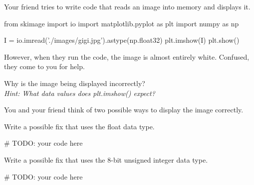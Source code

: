 \documentclass{csci1430}
\begin{document}
\pagebreak %

\begin{question}[points=5,drawbox=false] 
Your friend tries to write code that reads an image into memory and displays it.
\end{question}
    
\begin{python}
from skimage import io
import matplotlib.pyplot as plt
import numpy as np

I = io.imread('./images/gigi.jpg').astype(np.float32)
plt.imshow(I)
plt.show()
\end{python}
    
However, when they run the code, the image is almost entirely white. Confused, they come to you for help.

\begin{subquestion}[points=1]
Why is the image being displayed incorrectly?\\
\emph{Hint: What data values does plt.imshow() expect?}
\end{subquestion}

\begin{answer}[height=6]

\end{answer}

\begin{subquestion}[points=2,drawbox=false]
You and your friend think of two possible ways to display the image correctly.
\end{subquestion}

\begin{subsubquestion}[points=1]
Write a possible fix that uses the float data type.
\end{subsubquestion}

\begin{answer}[height=10]
\begin{python}
# TODO: your code here
\end{python}
\end{answer}


\pagebreak %

\begin{subsubquestion}[points=1]
Write a possible fix that uses the 8-bit unsigned integer data type.
\end{subsubquestion}

\begin{answer}[height=10]
\begin{python}
# TODO: your code here
\end{python}
\end{answer}
\end{document}
